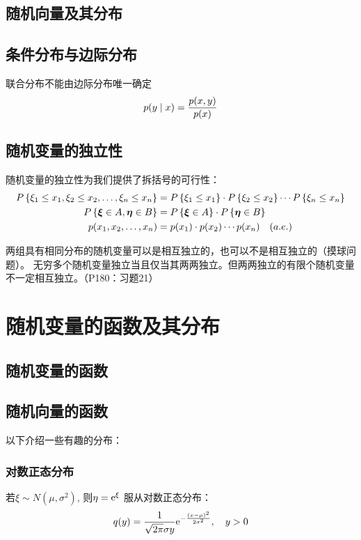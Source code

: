 \subsection{随机向量及其分布}
\subsection{条件分布与边际分布}
联合分布不能由边际分布唯一确定
\[
    p(y\mid x)=\frac{p(x,y)}{p(x)} \\
\]

\subsection{随机变量的独立性}
随机变量的独立性为我们提供了拆括号的可行性：
\begin{align*}
    P\left\{\xi_{1} \leq x_{1}, \xi_{2} \leq x_{2}, \dots ,
    \xi_{n} \leq x_{n}\right\} &=
    P\left\{\xi_{1} \leq x_{1}\right\} \cdot
    P\left\{\xi_{2} \leq x_{2}\right\} \cdots
    P\left\{\xi_{n} \leq x_{n}\right\}\\
    P\left\{\bm{\xi} \in A, \bm{\eta} \in B\right\} &=
    P\left\{\bm{\xi} \in A\right\} \cdot
    P\left\{\bm{\eta} \in B\right\} \\
    p(x_{1},x_{2},\ldots,x_{n}) &= p(x_{1}) \cdot p(x_{2})
    \cdots p(x_{n}) \quad (a. e.)
\end{align*}

两组具有相同分布的随机变量可以是相互独立的，也可以不是相互独立的（摸球问题）。
无穷多个随机变量独立当且仅当其两两独立。但两两独立的有限个随机变量不一定相互独立。（P180：习题21）

\section{随机变量的函数及其分布}
\subsection{随机变量的函数}
\subsection{随机向量的函数}

以下介绍一些有趣的分布：

\subsubsection{对数正态分布}
若\(\xi\sim N(\mu,\sigma^{2})\), 则\(\eta=\mathrm{e}^{\xi} \) 服从对数正态分布：
\[
    q(y) = \frac{1}{\sqrt{2\pi}\sigma y}
    \mathrm{e}^{-\frac{(x-\mu)^{2}}{2\sigma^{2}}},\quad y>0
\]

